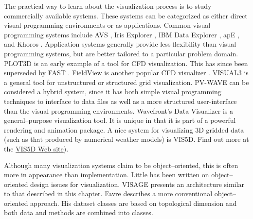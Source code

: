 The practical way to learn about the visualization process is to study commercially available systems. These systems can be categorized as either direct visual programming environments or as applications. Common visual programming systems include AVS \cite{AVS89}, Iris Explorer \cite{IrisExplorer}, IBM Data Explorer \cite{DataExplorer}, apE \cite{apE90}, and Khoros \cite{Rasure91}. Application systems generally provide less flexibility than visual programming systems, but are better tailored to a particular problem domain. PLOT3D \cite{PLOT3D} is an early example of a tool for CFD visualization. This has since been superseded by FAST \cite{FAST90}. FieldView is another popular CFD visualizer \cite{FieldView91}. VISUAL3 \cite{VISUAL3} is a general tool for unstructured or structured grid visualization. PV-WAVE \cite{Charal90} can be considered a hybrid system, since it has both simple visual programming techniques to interface to data files as well as a more structured user-interface than the visual programming environments. Wavefront's Data Visualizer \cite{DataVisualizer} is a general--purpose visualization tool. It is unique in that it is part of a powerful rendering and animation package. A nice system for visualizing 3D gridded data (such as that produced by numerical weather models) is VIS5D. Find out more at the \href{http://www.ssec.wisc.edu/\~billh/vis5d.html}{VIS5D Web site}).

Although many visualization systems claim to be object--oriented, this is often more in appearance than implementation. Little has been written on object--oriented design issues for visualization. VISAGE\cite{VISAGE92} presents an architecture similar to that described in this chapter. Favre \cite{Favre94} describes a more conventional object--oriented approach. His dataset classes are based on topological dimension and both data and methods are combined into classes.

\printbibliography

